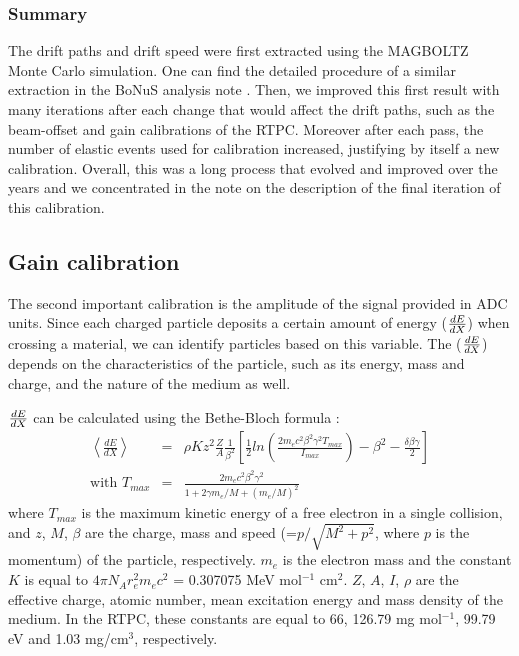 \subsubsection{Summary}
The drift paths and drift speed were first extracted using the
MAGBOLTZ Monte Carlo simulation. One can find the detailed procedure of
a similar extraction in the BoNuS analysis note \cite{GEM_holes}.
Then, we improved this first result with many iterations after each change that 
would affect the drift paths, such as the beam-offset and gain calibrations of 
the RTPC. Moreover after each pass, the number of elastic events used for 
calibration increased, justifying by itself a new calibration. Overall, this 
was a long process that evolved and improved over the years and we concentrated 
in the note on the description of the final iteration of this calibration.


\subsection{Gain calibration}
The second important calibration is the amplitude of the signal provided in ADC 
units. Since each charged particle deposits a certain amount of energy 
($\small{\frac{dE}{dX}}$) when crossing a material, we can identify particles 
based on this variable. The ($\small{\frac{dE}{dX}}$) depends on the 
characteristics of the particle, such as its energy, mass and charge, and the 
nature of the medium as well. 

$\small{\frac{dE}{dX}}$ can be calculated using the Bethe-Bloch formula \cite{bethe_block}:
\begin{eqnarray}
\left\langle \frac{dE}{dX} \right\rangle &=& \rho K z^{2} \frac{Z}{A} 
   \frac{1}{\beta^{2}} \left[ \frac{1}{2} ln 
   \left(\frac{2m_{e}c^{2}\beta^{2}\gamma^{2}T_{max}}{I_{max}} \right) - 
\beta^{2} -\frac{\delta\beta\gamma}{2}\right]\\
\text{with }
T_{max} &=& \frac{2m_{e}c^{2}\beta^{2}\gamma^{2}}{1+2\gamma m_{e}/M + (m_{e}/M)^{2}} 
\end{eqnarray}
where $T_{max}$ is the maximum kinetic energy of a free electron in a single 
collision, and $z$, $M$, $\beta$ are the charge, mass and speed (=$p/ \sqrt{M^2 
+ p^2}$, where $p$ is the momentum) of the particle, respectively.  $m_{e}$ is 
the electron mass and the constant $K$ is equal to $4 \pi N_{A} 
r^{2}_{e}m_{e}c^{2}$ = 0.307075 MeV mol$^{-1}$ cm$^{2}$. $Z$, $A$, $I$, $\rho$ 
are the effective charge, atomic number, mean excitation energy and mass 
density of the medium. In the RTPC, these constants are equal to 66, 126.79 mg 
mol$^{-1}$, 99.79 eV and 1.03 mg/cm$^3$, respectively. 

